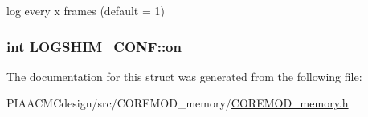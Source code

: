 log every x frames (default = 1) 

\hypertarget{structLOGSHIM__CONF_a399b782abca4a24ae8e5a3c11ac9bc48}{
\subsubsection[{on}]{\setlength{\rightskip}{0pt plus 5cm}int L\+O\+G\+S\+H\+I\+M\+\_\+\+C\+O\+N\+F\+::on}}\label{structLOGSHIM__CONF_a399b782abca4a24ae8e5a3c11ac9bc48}


The documentation for this struct was generated from the following file\+:\begin{DoxyCompactItemize}
\item 
P\+I\+A\+A\+C\+M\+Cdesign/src/\+C\+O\+R\+E\+M\+O\+D\+\_\+memory/\hyperlink{PIAACMCdesign_2src_2COREMOD__memory_2COREMOD__memory_8h}{C\+O\+R\+E\+M\+O\+D\+\_\+memory.\+h}\end{DoxyCompactItemize}

